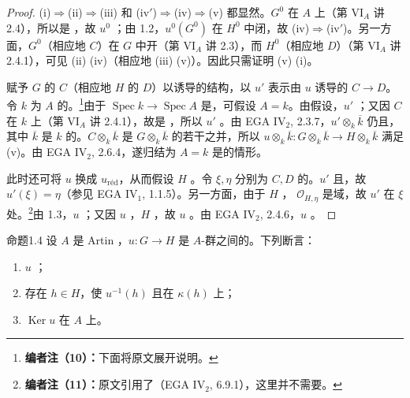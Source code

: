 \begin{proof}
(i)$\Rightarrow$(ii)$\Rightarrow$(iii) 和 (iv$'$)$\Rightarrow$(iv)$\Rightarrow$(v) 都显然。$G^0$ 在 $A$ 上（第 VI$_A$ 讲 2.4），所以是 ，故 $u^0$ ；由 1.2，$u^0(G^0)$ 在 $H^0$ 中闭，故 (iv)$\Rightarrow$(iv$'$)。另一方面，$G^0$（相应地 $C$）在 $G$ 中开（第 VI$_A$ 讲 2.3），而 $H^0$（相应地 $D$）（第 VI$_A$ 讲 2.4.1），可见 (ii)  (iv)（相应地 (iii)  (v)）。因此只需证明 (v)  (i)。

赋予 $G$ 的 $C$（相应地 $H$ 的 $D$）以诱导的结构，以 $u'$ 表示由 $u$ 诱导的 $C\to D$。令 $k$ 为 $A$ 的。\footnote{\textbf{编者注（10）：}下面将原文展开说明。}由于 $\operatorname{Spec}k\to\operatorname{Spec}A$ 是，可假设 $A=k$。由假设，$u'$ ；又因 $C$ 在 $k$ 上（第 VI$_A$ 讲 2.4.1），故是 ，所以 $u'$ 。由 EGA IV$_2$, 2.3.7，$u'\otimes_k\overline k$ 仍且，其中 $\overline k$ 是 $k$ 的。$C\otimes_k\overline k$ 是 $G\otimes_k\overline k$ 的若干之并，所以 $u\otimes_k\overline k:G\otimes_k\overline k\to H\otimes_k\overline k$ 满足 (v)。由 EGA IV$_2$, 2.6.4，遂归结为 $A=k$ 是的情形。

此时还可将 $u$ 换成 $u_{\mathrm{r\text{é}d}}$，从而假设 $H$ 。令 $\xi,\eta$ 分别为 $C,D$ 的。$u'$ 且，故 $u'(\xi)=\eta$（参见 EGA IV$_1$, 1.1.5）。另一方面，由于 $H$ ， $\mathcal O_{H,\eta}$ 是域，故 $u'$ 在 $\xi$ 处。\footnote{\textbf{编者注（11）：}原文引用了（EGA IV$_2$, 6.9.1），这里并不需要。}由 1.3，$u$ ；又因 $u$ ，$H$ ，故 $u$ 。由 EGA IV$_2$, 2.4.6，$u$ 。
\end{proof}
\begin{SGAresult}{命题}{1.4}
设 $A$ 是 Artin ，$u:G\to H$ 是 $A$-群之间的。下列断言：
\begin{enumerate}
\item[(i)] $u$ ；
\item[(ii)] 存在 $h\in H$，使 $u^{-1}(h)$ 且在 $\kappa(h)$ 上；
\item[(iii)] $\operatorname{Ker}u$ 在 $A$ 上。
\end{enumerate}
\end{SGAresult}
